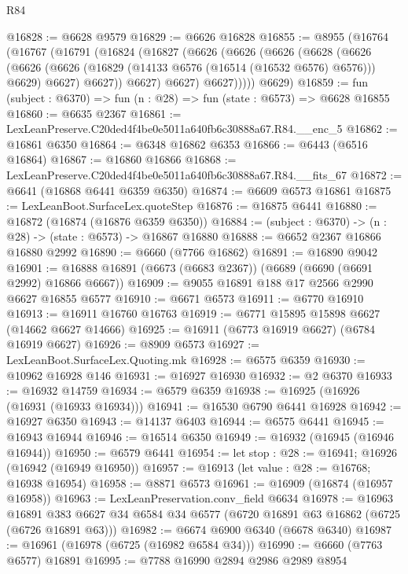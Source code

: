 \begin{lexlean}{R84}
\begin{coremodule}
@16828 := @6628 @9579
@16829 := @6626 @16828
@16855 := @8955
    (@16764
      (@16767
        (@16791
          (@16824
            (@16827
              (@6626
                (@6626
                  (@6626
                    (@6628
                      (@6626
                        (@6626
                          (@6626 (@16829 (@14133 @6576 (@16514 (@16532 @6576) @6576))) @6629)
                          @6627)
                        @6627))
                    @6627)
                  @6627)
                @6627)))))
      @6629)
@16859 := fun (subject : @6370) => fun (n : @28) => fun (state : @6573) => @6628 @16855
@16860 := @6635 @2367
@16861 := LexLeanPreserve.C20ded4f4be0e5011a640fb6c30888a67.R84.__enc_5
@16862 := @16861 @6350
@16864 := @6348 @16862 @6353
@16866 := @6443 (@6516 @16864)
@16867 := @16860 @16866
@16868 := LexLeanPreserve.C20ded4f4be0e5011a640fb6c30888a67.R84.__fits_67
@16872 := @6641 (@16868 @6441 @6359 @6350)
@16874 := @6609 @6573 @16861
@16875 := LexLeanBoot.SurfaceLex.quoteStep
@16876 := @16875 @6441
@16880 := @16872 (@16874 (@16876 @6359 @6350))
@16884 := (subject : @6370) -> (n : @28) -> (state : @6573) -> @16867 @16880
@16888 := @6652 @2367 @16866 @16880 @2992
@16890 := @6660 (@7766 @16862)
@16891 := @16890 @9042
@16901 := @16888 @16891 (@6673 (@6683 @2367)) (@6689 (@6690 (@6691 @2992) @16866 @6667))
@16909 := @9055 @16891 @188 @17 @2566 @2990 @6627 @16855 @6577
@16910 := @6671 @6573
@16911 := @6770 @16910
@16913 := @16911 @16760 @16763
@16919 := @6771 @15895 @15898 @6627 (@14662 @6627 @14666)
@16925 := @16911 (@6773 @16919 @6627) (@6784 @16919 @6627)
@16926 := @8909 @6573
@16927 := LexLeanBoot.SurfaceLex.Quoting.mk
@16928 := @6575 @6359
@16930 := @10962 @16928 @146
@16931 := @16927 @16930
@16932 := @2 @6370
@16933 := @16932 @14759
@16934 := @6579 @6359
@16938 := @16925 (@16926 (@16931 (@16933 @16934)))
@16941 := @16530 @6790 @6441 @16928
@16942 := @16927 @6350
@16943 := @14137 @6403
@16944 := @6575 @6441
@16945 := @16943 @16944
@16946 := @16514 @6350
@16949 := @16932 (@16945 (@16946 @16944))
@16950 := @6579 @6441
@16954 := let stop : @28 := @16941; @16926 (@16942 (@16949 @16950))
@16957 := @16913 (let value : @28 := @16768; @16938 @16954)
@16958 := @8871 @6573
@16961 := @16909 (@16874 (@16957 @16958))
@16963 := LexLeanPreservation.conv_field @6634
@16978 := @16963
    @16891
    @383
    @6627
    @34
    @6584
    @34
    @6577
    (@6720 @16891 @63 @16862 (@6725 (@6726 @16891 @63)))
@16982 := @6674 @6900 @6340 (@6678 @6340)
@16987 := @16961 (@16978 (@6725 (@16982 @6584 @34)))
@16990 := @6660 (@7763 @6577) @16891
@16995 := @7788 @16990 @2894 @2986 @2989 @8954

\end{coremodule}
\end{lexlean}
